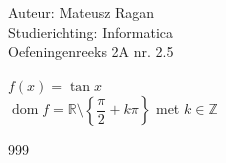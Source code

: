 \documentclass[a4paper]{article}
\begin{document}
\noindent \large Auteur: Mateusz Ragan \\
\noindent \large Studierichting: Informatica\\
\noindent \large Oefeningenreeks 2A nr. 2.5\\

\medskip

\normalsize

$f(x) = \tan x$ \\

$\operatorname{dom} f = \mathbb{R} \setminus \left\{\dfrac{\pi}{2} + k \pi\right\}$ met $k \in \mathbb{Z}$

\begin{thebibliography}{999}
\end{thebibliography}
\end{document}
